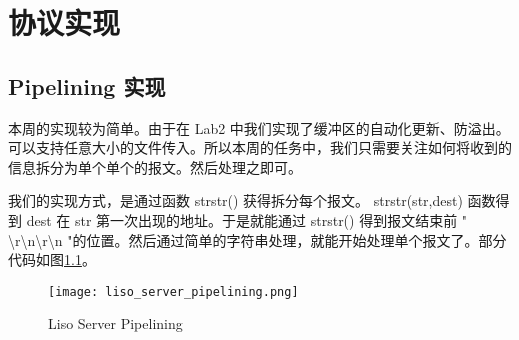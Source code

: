 
\chapter{协议实现}

\section{Pipelining 实现}

本周的实现较为简单。由于在 Lab2 中我们实现了缓冲区的自动化更新、防溢出。可以支持任意大小的文件传入。所以本周的任务中，我们只需要关注如何将收到的信息拆分为单个单个的报文。然后处理之即可。

我们的实现方式，是通过函数 strstr() 获得拆分每个报文。 strstr(str,dest) 函数得到 dest 在 str 第一次出现的地址。于是就能通过 strstr() 得到报文结束前 " \textbackslash r\textbackslash n\textbackslash r\textbackslash n "的位置。然后通过简单的字符串处理，就能开始处理单个报文了。部分代码如图\ref{fig:liso_server_pipelining}。

\begin{figure}[htbp!]
    \centering
    \texttt{[image: liso\_server\_pipelining.png]}
    \caption{Liso Server Pipelining}\label{fig:liso_server_pipelining}
\end{figure}



